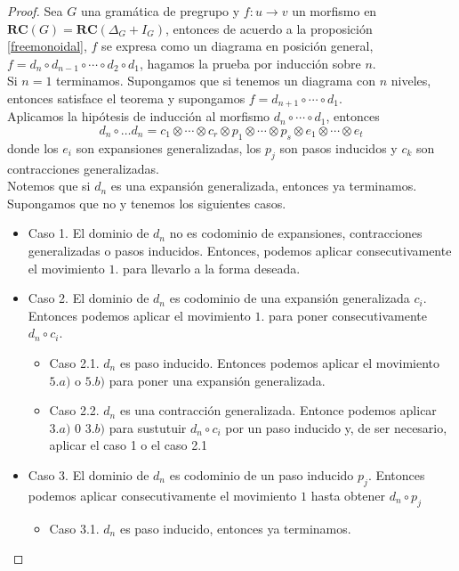 \documentclass[../main.tex]{subfiles}
\begin{document}
    \begin{proof}
        Sea $G$ una gramática de pregrupo y $f: u \to v$ un morfismo en $\textbf{RC}(G)=\textbf{RC}(\Delta_G+I_G)$, entonces de acuerdo a la proposición \ref{freemonoidal}, $f$ se expresa como un diagrama en posición general, $f=d_n \circ d_{n-1} \circ \cdots \circ d_2 \circ d_1$, hagamos la prueba por inducción sobre $n$. \\
        Si $n=1$ terminamos. Supongamos que si tenemos un diagrama con $n$ niveles, entonces satisface el teorema y supongamos $f= d_{n+1} \circ \cdots \circ d_1$. \\
        Aplicamos la hipótesis de inducción al morfismo $d_n \circ \cdots \circ d_1$, entonces 
        $$d_n \circ \dots d_n =  c_1 \otimes \cdots \otimes c_r \otimes p_1 \otimes \cdots \otimes p_s \otimes e_1 \otimes \cdots \otimes e_t$$
        donde los $e_i$ son expansiones generalizadas, los $p_j$ son pasos inducidos y $c_k$ son contracciones generalizadas. \\
        Notemos que si $d_n$ es una expansión generalizada, entonces ya terminamos. Supongamos que no y tenemos los siguientes casos. 
        \begin{itemize}
            \item Caso 1. El dominio de $d_n$ no es codominio de expansiones, contracciones generalizadas o pasos inducidos. Entonces, podemos aplicar consecutivamente el movimiento $1.$ para llevarlo a la forma deseada. 
            \item Caso 2. El dominio de $d_n$ es codominio de una expansión generalizada $c_i$. Entonces podemos aplicar el movimiento $1.$ para poner consecutivamente $d_n \circ c_i$.
            \begin{itemize}
                \item Caso 2.1. $d_n$ es paso inducido. Entonces podemos aplicar el movimiento $5.a)$ o $5.b)$ para poner una expansión generalizada. 
                \item Caso 2.2. $d_n$ es una contracción generalizada. Entonce podemos aplicar $3.a)$ 0 $3.b)$ para sustutuir $d_n \circ c_i$ por un paso inducido y, de ser necesario, aplicar el caso 1 o el caso 2.1
            \end{itemize}
            \item Caso 3. El dominio de $d_n$ es codominio de un paso inducido $p_j$. Entonces podemos aplicar consecutivamente el movimiento $1$ hasta obtener $d_n \circ p_j$ 
            \begin{itemize}
                \item Caso 3.1. $d_n$ es paso inducido, entonces ya terminamos. 

\end{itemize}
\end{itemize}
\end{proof}
\end{document}
